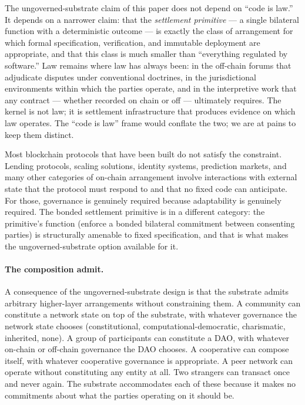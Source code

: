 \documentclass[11pt,a4paper]{article}
\theoremstyle{remark}
\begin{document}
The ungoverned-substrate claim of this paper does not depend on
``code is law.'' It depends on a narrower claim: that the
\emph{settlement primitive} --- a single bilateral function with a
deterministic outcome --- is exactly the class of arrangement for
which formal specification, verification, and immutable
deployment are appropriate, and that this class is much smaller
than ``everything regulated by software.'' Law remains where
law has always been: in the off-chain forums that adjudicate
disputes under conventional doctrines, in the jurisdictional
environments within which the parties operate,
and in the interpretive work that any contract --- whether
recorded on chain or off --- ultimately requires. The kernel is
not law; it is settlement infrastructure that produces evidence
on which law operates. The ``code is law'' frame would conflate
the two; we are at pains to keep them distinct.

Most blockchain protocols that have been built do not satisfy
the constraint. Lending protocols, scaling solutions, identity
systems, prediction markets, and many other categories of
on-chain arrangement involve interactions with external state
that the protocol must respond to and that no fixed code can
anticipate. For those, governance is genuinely required because
adaptability is genuinely required. The bonded settlement
primitive is in a different category: the primitive's function
(enforce a bonded bilateral commitment between consenting
parties) is structurally amenable to fixed specification, and
that is what makes the ungoverned-substrate option available
for it.

\paragraph{The composition admit.}
A consequence of the ungoverned-substrate design is that the
substrate admits arbitrary higher-layer arrangements without
constraining them. A community can constitute a network state on
top of the substrate, with whatever governance the network state
chooses (constitutional, computational-democratic, charismatic,
inherited, none). A group of participants can constitute a DAO,
with whatever on-chain or off-chain governance the DAO chooses.
A cooperative can compose itself, with whatever cooperative
governance is appropriate. A peer network can operate without
constituting any entity at all. Two strangers can transact once
and never again. The substrate accommodates each of these
because it makes no commitments about what the parties operating
on it should be.
\end{document}
